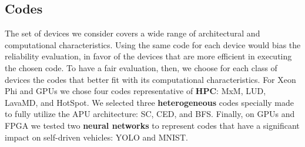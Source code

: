 %
%
%
%
%


\subsection{Codes}
\label{subsec_codes}

The set of devices we consider covers a wide range of architectural and computational characteristics. Using the same code for each device would bias the reliability evaluation, in favor of the devices that are more efficient in executing the chosen code. 
To have a fair evaluation, then, we choose for each class of devices the codes that better fit with its computational characteristics. For Xeon Phi and GPUs we chose four codes representative of \textbf{HPC}: MxM, LUD, LavaMD, and HotSpot. We selected three \textbf{heterogeneous} codes specially made to fully utilize the APU architecture: SC, CED, and BFS. Finally, on GPUs and FPGA we tested two \textbf{neural networks} to represent codes that  have a significant impact on self-driven vehicles: YOLO and MNIST. 

